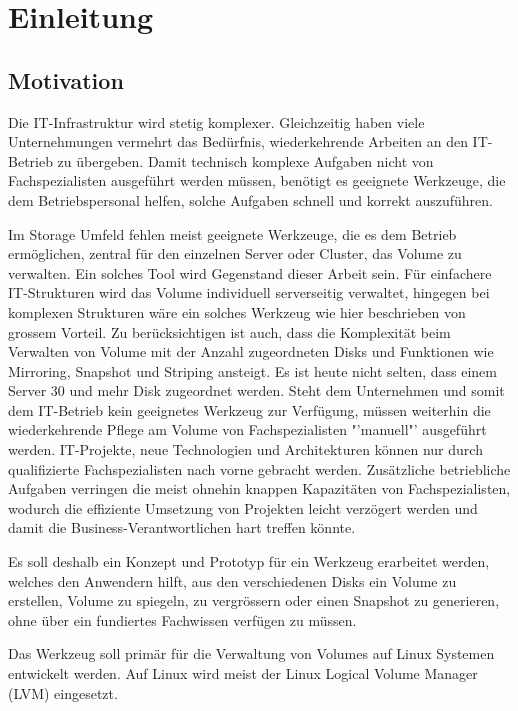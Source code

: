 \chapter{Einleitung}
\label{cha:Einleitung}

\section{Motivation}

Die IT-Infrastruktur wird stetig komplexer. Gleichzeitig haben viele Unternehmungen vermehrt das Bedürfnis, wiederkehrende Arbeiten an den IT-Betrieb zu übergeben. Damit technisch komplexe Aufgaben nicht von Fachspezialisten ausgeführt werden müssen, benötigt es geeignete Werkzeuge, die dem Betriebspersonal helfen, solche Aufgaben schnell und korrekt auszuführen.

Im Storage Umfeld fehlen meist geeignete Werkzeuge, die es dem Betrieb ermöglichen, zentral für den einzelnen Server oder Cluster, das Volume zu verwalten. Ein solches Tool wird Gegenstand dieser Arbeit sein. Für einfachere IT-Strukturen wird das Volume individuell serverseitig verwaltet, hingegen bei komplexen Strukturen wäre ein solches Werkzeug wie hier beschrieben von grossem Vorteil. Zu berücksichtigen ist auch, dass die Komplexität beim Verwalten von Volume mit der Anzahl zugeordneten Disks und Funktionen wie Mirroring, Snapshot und Striping ansteigt. Es ist heute nicht selten, dass einem Server 30 und mehr Disk zugeordnet werden. Steht dem Unternehmen und somit dem IT-Betrieb kein geeignetes Werkzeug zur Verfügung, müssen weiterhin die wiederkehrende Pflege am Volume von Fachspezialisten "'manuell"' ausgeführt werden. IT-Projekte, neue Technologien und Architekturen können nur durch qualifizierte Fachspezialisten nach vorne gebracht werden. Zusätzliche betriebliche Aufgaben verringen die meist ohnehin knappen Kapazitäten von Fachspezialisten, wodurch die effiziente Umsetzung von Projekten leicht verzögert werden und damit die Business-Verantwortlichen hart treffen könnte.

Es soll deshalb ein Konzept und Prototyp für ein Werkzeug erarbeitet werden, welches den Anwendern hilft, aus den verschiedenen Disks ein Volume zu erstellen, Volume zu spiegeln, zu vergrössern oder einen Snapshot zu generieren, ohne über ein fundiertes Fachwissen verfügen zu müssen.

Das Werkzeug soll primär für die Verwaltung von Volumes auf Linux Systemen entwickelt werden. Auf Linux wird meist der Linux Logical Volume Manager (LVM) eingesetzt.

